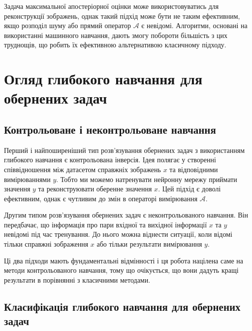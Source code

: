 \documentclass[14pt,a4paper]{extarticle}
\newcounter{e}
\numberwithin{equation}{section}
\numberwithin{figure}{section}
\begin{document}
	Задача максимальної апостеріорної оцінки може використовуватись для реконструкції зображень, однак такий підхід може бути не таким ефективним, якщо розподіл шуму або прямий оператор $\mathcal{A}$ є невідомі.  
	Алгоритми, основані на використанні машинного навчання, дають змогу побороти більшість з цих труднощів, що робить їх ефективною альтернативою класичному підходу.

	\newpage
	\thispagestyle{empty}
	\section{Огляд глибокого навчання для обернених задач}

	\subsection{Контрольоване і неконтрольоване навчання}
	Перший і найпоширеніший тип розв'язування обернених задач з використанням глибокого навчання є контрольована інверсія. Ідея полягає у створенні співвідношення між датасетом справжніх зображень $x$ та відповідними вимірюваннями $y$. Тобто ми можемо натренувати нейронну мережу приймати значення $y$ та реконструювати оберенне значення $x$. Цей підхід є доволі ефективним, однак є чутливим до змін в операторі вимірювання $\mathcal{A}$. 
	
	Другим типом розв'язування обернених задач є неконтрольованого навчання. Він передбачає, що інформація про пари вхідної та вихідної інформації $x$ та $y$ невідомі під час тренування. До нього можна віднести ситуації, коли відомі тільки справжні зображення $x$ або тільки результати вимірювання $y$.
	
	Ці два підходи мають фундаментальні відмінності і ця робота націлена саме на методи контрольованого навчання, тому що очікується, що вони дадуть кращі результати в порівнянні з класичними методами. 
	
	\subsection{Класифікація глибокого навчання для обернених задач}
\end{document}
